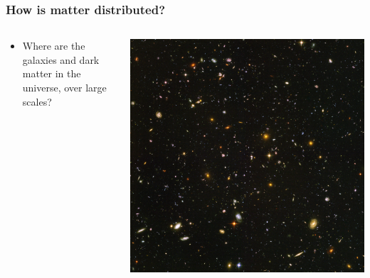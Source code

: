 \documentclass{beamer}
\begin{document}
\frame
{

    \frametitle{How is matter distributed?}


    \begin{columns}
        \begin{column}{0.5\textwidth}
            \begin{itemize}

                \item Where are the galaxies and dark matter in the universe,
                    over large scales?

            \end{itemize}
        \end{column}
        \begin{column}{0.5\textwidth}
            \begin{center}
                \includegraphics[width=\textwidth]{UDF_half.jpg}
            \end{center}
        \end{column}
    \end{columns}


}
\end{document}
